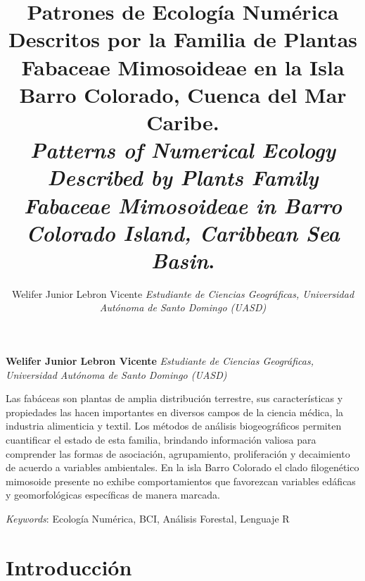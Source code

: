 \documentclass[11pt,]{article}
\title{Patrones de Ecología Numérica Descritos por la Familia de Plantas
Fabaceae Mimosoideae en la Isla Barro Colorado, Cuenca del Mar Caribe.\\
\emph{Patterns of Numerical Ecology Described by Plants Family Fabaceae
Mimosoideae in Barro Colorado Island, Caribbean Sea Basin}.\\  }
\author{\Large Welifer Junior Lebron Vicente\vspace{0.05in} \newline\normalsize\emph{Estudiante de Ciencias Geográficas, Universidad Autónoma de Santo
Domingo (UASD)}  }
\date{}
\newcommand*{\authorfont}{\fontfamily{phv}\selectfont}
\renewenvironment{abstract}
 {{%
    \setlength{\leftmargin}{0mm}
    \setlength{\rightmargin}{\leftmargin}%
  }%
  \relax}
 {\endlist}
\begin{document}
	
%

{%
\setlength{\parindent}{0pt}
\thispagestyle{plain}
{\fontsize{18}{20}\selectfont\raggedright 
\maketitle  %

}

{
   \vskip 13.5pt\relax \normalsize\fontsize{11}{12} 
\textbf{\authorfont Welifer Junior Lebron Vicente} \hskip 15pt \emph{\small Estudiante de Ciencias Geográficas, Universidad Autónoma de Santo
Domingo (UASD)}   

}

}








\begin{abstract}

    \hbox{\vrule height .2pt width 39.14pc}

    \vskip 8.5pt %

\noindent Las fabáceas son plantas de amplia distribución terrestre, sus
características y propiedades las hacen importantes en diversos campos
de la ciencia médica, la industria alimenticia y textil. Los métodos de
análisis biogeográficos permiten cuantificar el estado de esta familia,
brindando información valiosa para comprender las formas de asociación,
agrupamiento, proliferación y decaimiento de acuerdo a variables
ambientales. En la isla Barro Colorado el clado filogenético mimosoide
presente no exhibe comportamientos que favorezcan variables edáficas y
geomorfológicas específicas de manera marcada.


\vskip 8.5pt \noindent \emph{Keywords}: Ecología Numérica, BCI, Análisis Forestal, Lenguaje R \par

    \hbox{\vrule height .2pt width 39.14pc}



\end{abstract}


\vskip 6.5pt


\noindent  \section{Introducción}\label{introducciuxf3n}
\end{document}
